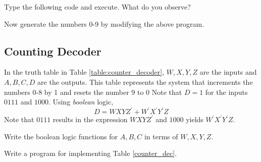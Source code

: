 \begin{problem}
\label{prob:first_code}
Type the following code and execute. What do you observe?

%
\end{problem}
\begin{problem}
Now generate the numbers 0-9 by modifying the above program.
\end{problem}
%

%
\subsection{Counting Decoder}
	In the  truth table in Table \ref{table:counter_decoder},  $W,X,Y,Z$ are the inputs
and $A,B,C,D$ are the outputs. This table represents the system that increments the numbers 0-8 by 1 and resets the number 9 to 0
%
Note that  $D = 1$ for the inputs $0111$ and $1000$.  Using {\em boolean} logic,
%
\begin{equation}
\label{bool_logic}
D = WXYZ^{'} + W^{'}X^{'}Y^{'}Z
\end{equation}
%
Note that $0111$ results in the expression $WXYZ^{'}$ and $1000$ yields $W^{'}X^{'}Y^{'}Z$. 

\begin{problem}
	\label{counter_dec}

Write the boolean logic functions for $A,B,C$ in terms of $W,X,Y,Z$.
\end{problem}
%

%
%
\begin{problem}
Write a program for implementing Table \ref{counter_dec}.
\end{problem}
%
\solution

%

